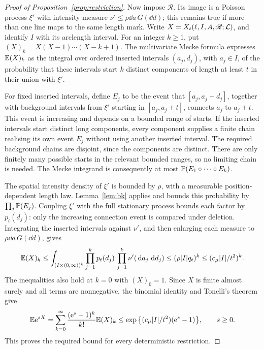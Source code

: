 \documentclass[11pt,letterpaper]{article}
\begin{document}
\begin{proof}[Proof of Proposition~\ref{prop:restriction}]
Now impose $\mathscr R$. Its image is a Poisson process $\xi'$ with intensity measure $\nu'\le\rho\dd a\,G(\dd d)$; this remains true if more than one line maps to the same length mark. Write $X=X_t(\ell,I,A,\mathscr R;\cL)$, and identify $I$ with its arclength interval. For an integer $k\ge1$, put $(X)_k=X(X-1)\cdots(X-k+1)$. The multivariate Mecke formula expresses $\E(X)_k$ as the integral over ordered inserted intervals $(a_j,d_j)$, with $a_j\in I$, of the probability that these intervals start $k$ distinct components of length at least $t$ in their union with $\xi'$.

For fixed inserted intervals, define $E_j$ to be the event that $[a_j,a_j+d_j]$, together with background intervals from $\xi'$ starting in $[a_j,a_j+t]$, connects $a_j$ to $a_j+t$. This event is increasing and depends on a bounded range of starts. If the inserted intervals start distinct long components, every component supplies a finite chain realising its own event $E_j$ without using another inserted interval. The required background chains are disjoint, since the components are distinct. There are only finitely many possible starts in the relevant bounded ranges, so no limiting chain is needed. The Mecke integrand is consequently at most $\P(E_1\circ\cdots\circ E_k)$.

The spatial intensity density of $\xi'$ is bounded by $\rho$, with a measurable position-dependent length law. Lemma~\ref{lem:bk} applies and bounds this probability by $\prod_j\P(E_j)$. Coupling $\xi'$ with the full stationary process bounds each factor by $p_t(d_j)$: only the increasing connection event is compared under deletion. Integrating the inserted intervals against $\nu'$, and then enlarging each measure to $\rho\dd a\,G(\dd d)$, gives
\begin{equation}\label{eq:factorial}
 \E(X)_k
 \le\int_{(I\times(0,\infty))^k}\prod_{j=1}^kp_t(d_j)
                    \,\prod_{j=1}^k\nu'(\dd a_j\,\dd d_j)
 \le(\rho|I|q_t)^k\le(c_\mu|I|/t^2)^k.
\end{equation}
The inequalities also hold at $k=0$ with $(X)_0=1$. Since $X$ is finite almost surely and all terms are nonnegative, the binomial identity and Tonelli's theorem give
\begin{equation}\label{eq:mgf-proof}
 \E\e^{sX}
 =\sum_{k=0}^\infty\frac{(\e^s-1)^k}{k!}\E(X)_k
 \le\exp\big\{(c_\mu|I|/t^2)(\e^s-1)\big\},\qquad s\ge0.
\end{equation}
This proves the required bound for every deterministic restriction.
\end{proof}
\end{document}
